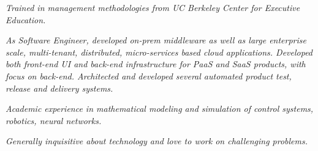

{\selectfont
	\begin{justify}\textit{Trained in management methodologies from UC Berkeley Center for Executive Education.}\end{justify}
}
{\selectfont
	\begin{justify}\textit{As Software Engineer, developed on-prem middleware as well as large enterprise scale, multi-tenant, distributed, micro-services based cloud applications. Developed both front-end UI and back-end infrastructure for PaaS and SaaS products, with focus on back-end. Architected and developed several automated product test, release and delivery systems.}\end{justify}
}

{\selectfont
	\begin{justify}\textit{Academic experience in mathematical modeling and simulation of control systems, robotics, neural networks.}\end{justify}
}

{\selectfont
	\begin{justify}\textit{Generally inquisitive about technology and love to work on challenging problems.}\end{justify}
}